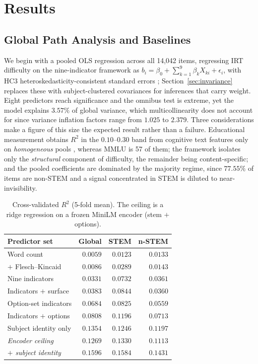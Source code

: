 \section{Results}\label{results}

\subsection{Global Path Analysis and Baselines}\label{sec:global}

We begin with a pooled OLS regression across all 14,042 items, regressing IRT difficulty on the nine-indicator framework as $b_{i} = \beta_{0} + \sum_{k = 1}^{9}\beta_{k}X_{ki} + \epsilon_{i}$, with HC3 heteroskedasticity-consistent standard errors \citep{mackinnon1985}; Section~\ref{sec:invariance} replaces these with subject-clustered covariances for inferences that carry weight. Eight predictors reach significance and the omnibus test is extreme, yet the model explains $3.57\%$ of global variance, which multicollinearity does not account for since variance inflation factors range from $1.025$ to $2.379$. Three considerations make a figure of this size the expected result rather than a failure. Educational measurement obtains $R^{2}$ in the $0.10$--$0.30$ band from cognitive text features only on \emph{homogeneous} pools \citep{embretson1987}, whereas MMLU is 57 of them; the framework isolates only the \emph{structural} component of difficulty, the remainder being content-specific; and the pooled coefficients are dominated by the majority regime, since $77.55\%$ of items are non-STEM and a signal concentrated in STEM is diluted to near-invisibility.

\begin{table}[t]
\centering\scriptsize
\setlength{\tabcolsep}{3.5pt}
\begin{tabular}{@{}lrrr@{}}
\toprule
\textbf{Predictor set} & \textbf{Global} & \textbf{STEM} & \textbf{n-STEM} \\
\midrule
Word count                  & $0.0059$ & $0.0123$ & $0.0133$ \\
$+$ Flesch--Kincaid         & $0.0086$ & $0.0289$ & $0.0143$ \\
Nine indicators             & $\mathbf{0.0331}$ & $\mathbf{0.0732}$ & $\mathbf{0.0361}$ \\
Indicators $+$ surface      & $0.0383$ & $0.0844$ & $0.0360$ \\
Option-set indicators       & $0.0684$ & $0.0825$ & $0.0559$ \\
Indicators $+$ options      & $0.0808$ & $0.1196$ & $0.0713$ \\
\midrule
Subject identity only       & $0.1354$ & $0.1246$ & $0.1197$ \\
\emph{Encoder ceiling}      & $0.1269$ & $0.1330$ & $0.1113$ \\
\emph{$+$ subject identity} & $0.1596$ & $0.1584$ & $0.1431$ \\
\bottomrule
\end{tabular}
\caption{Cross-validated $R^2$ (5-fold mean). The ceiling is a ridge regression on a frozen MiniLM encoder (stem $+$ options).}
\label{tab:baselines}
\end{table}

